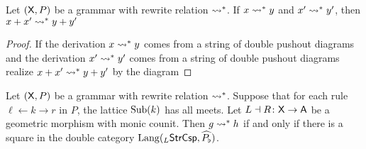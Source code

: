 \documentclass[oneside]{amsart}
\begin{document}
\begin{lemma} \label{thm:rewrite-rel-is-additive}
  Let $( \mathsf{X},P )$ be a grammar with rewrite relation $\rightsquigarrow^\ast$.
  If $ x \rightsquigarrow^\ast y $ and $ x' \rightsquigarrow^\ast y' $, then
  $ x+x' \rightsquigarrow^\ast y+y' $
\end{lemma}

\begin{proof}
  If the derivation $ x \rightsquigarrow^\ast y $ comes from a string of
  double pushout diagrams
   and the derivation
  $ x' \rightsquigarrow^\ast y' $ comes from a string of double pushout
  diagrams  realize
  $ x+x' \rightsquigarrow^\ast y+y' $ by the diagram
  
\end{proof}

\begin{theorem} \label{thm:inductive-rewriting} Let
  $ ( \mathsf{X} , P ) $ be a grammar with rewrite relation
  $\rightsquigarrow^\ast$. Suppose that for each rule
  $\ell \gets k \to r$ in $P$, the lattice $ \operatorname{Sub} (k) $ has
  all meets.  Let $ L \dashv R \colon \mathsf{X} \to \mathsf{A} $ be a
  geometric morphism with monic counit. Then
  $ g \rightsquigarrow^\ast h $ if and only if there is a square
   in the double
  category $ \mathrm{Lang} ( _{L}\mathsf{StrCsp} , \widehat{P_\flat} ) $.
\end{theorem}
\end{document}
